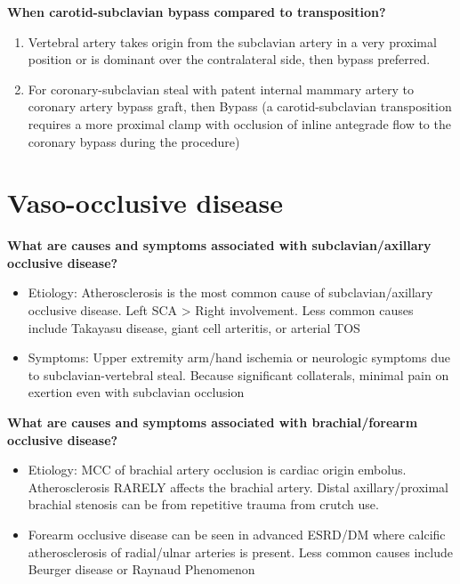 \documentclass[
]{book}
\begin{document}
\textbf{When carotid-subclavian bypass compared to transposition?}~~

\begin{enumerate}
\def\labelenumi{\arabic{enumi}.}
\item
  Vertebral artery takes origin from the subclavian artery in a very
  proximal position or is dominant over the contralateral side, then
  bypass preferred. \citep{moraschTechniqueSubclavianCarotid2009d}
\item
  For coronary-subclavian steal with patent internal mammary artery to
  coronary artery bypass graft, then Bypass (a carotid-subclavian
  transposition requires a more proximal clamp with occlusion of
  inline antegrade flow to the coronary bypass during the procedure)
  \citep{cuaReviewCoronarySubclavian2017}
\end{enumerate}

\hypertarget{vaso-occlusive-disease}{%
\section{Vaso-occlusive disease}\label{vaso-occlusive-disease}}

\textbf{What are causes and symptoms associated with subclavian/axillary
occlusive disease?} \citep{jacklcronenwettVascularDecisionMaking2020}

\begin{itemize}
\item
  Etiology: Atherosclerosis is the most common cause of
  subclavian/axillary occlusive disease. Left SCA \textgreater{} Right involvement.
  Less common causes include Takayasu disease, giant cell arteritis,
  or arterial TOS
\item
  Symptoms: Upper extremity arm/hand ischemia or neurologic symptoms
  due to subclavian-vertebral steal. Because significant collaterals,
  minimal pain on exertion even with subclavian occlusion
\end{itemize}

\textbf{What are causes and symptoms associated with brachial/forearm
occlusive disease?}

\begin{itemize}
\item
  Etiology: MCC of brachial artery occlusion is cardiac origin
  embolus. Atherosclerosis RARELY affects the brachial artery. Distal
  axillary/proximal brachial stenosis can be from repetitive trauma
  from crutch use.~
\item
  Forearm occlusive disease can be seen in advanced ESRD/DM where
  calcific atherosclerosis of radial/ulnar arteries is present. Less
  common causes include Beurger disease or Raynaud Phenomenon~
\end{itemize}
\end{document}
